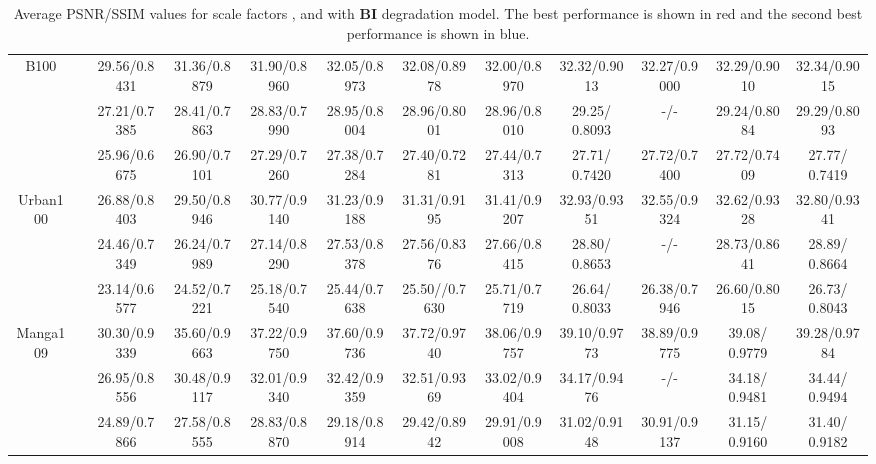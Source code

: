 \documentclass[10pt,twocolumn,letterpaper]{article}
\begin{document}
\begin{table*}[!htbp]
{\begin{tabular}{|c|c|c|c|c|c|c|c||c|c|c|c|}
			\multirow{3}{*}{B100}     &  &  29.56/0.8431            &     31.36/0.8879        &   31.90/0.8960   &     32.05/0.8973     &    32.08/0.8978  & 32.00/0.8970   &  {\color{blue}32.32}/{\color{blue}0.9013}    &   32.27/0.9000  &  32.29/0.9010    &   {\color{red}32.34}/{\color{red}0.9015}   \\
			&  &    27.21/0.7385          &    28.41/0.7863          &  28.83/0.7990    &       28.95/0.8004     &   28.96/0.8001 & 28.96/0.8010    &  {\color{blue}29.25}/{\color{red} 0.8093}    &    -/-   &  29.24/{\color{blue}0.8084}    &  {\color{red}29.29}/{\color{red}0.8093}     \\ 
			&  &    25.96/0.6675          &     26.90/0.7101         &   27.29/0.7260   &    27.38/0.7284        &     27.40/0.7281 & 27.44/0.7313  &   27.71/{\color{blue} 0.7420}   &  {\color{blue} 27.72}/0.7400    &  {\color{blue} 27.72}/0.7409    &  {\color{red} 27.77}/{\color{red} 0.7419}      \\ \hline\hline
			\multirow{3}{*}{Urban100} &  &  26.88/0.8403            &    29.50/0.8946          &  30.77/0.9140    &        31.23/0.9188    &    31.31/0.9195  & 31.41/0.9207  &  {\color{red}32.93}/{\color{red}0.9351}    &   32.55/0.9324   &  32.62/0.9328    &  {\color{blue}32.80}/{\color{blue}0.9341}     \\ 
			&  &   24.46/0.7349           &     26.24/0.7989         &  27.14/0.8290    &       27.53/0.8378       &   27.56/0.8376 & 27.66/0.8415    &   {\color{blue}28.80}/{\color{blue} 0.8653}   &   -/-   &    28.73/0.8641  &   {\color{red} 28.89}/{\color{red} 0.8664}    \\
			&  &   23.14/0.6577            &       24.52/0.7221       &    25.18/0.7540  &      25.44/0.7638       &    25.50//0.7630  & 25.71/0.7719  &   {\color{blue} 26.64}/{\color{blue} 0.8033}   &   26.38/0.7946   &  26.60/0.8015   & {\color{red} 26.73}/{\color{red} 0.8043}      \\ \hline\hline
			\multirow{3}{*}{Manga109} &  &  30.30/0.9339            &     35.60/0.9663         &   37.22/0.9750   &    37.60/0.9736      &    37.72/0.9740  & 38.06/0.9757  &   {\color{blue}39.10}/0.9773   &   38.89/0.9775   &  39.08/{\color{blue} 0.9779}    &    {\color{red}39.28}/{\color{red}0.9784}  \\ 
			&  &    26.95/0.8556          &      30.48/0.9117        &   32.01/0.9340   &      32.42/0.9359       &   32.51/0.9369  & 33.02/0.9404   &   34.17/0.9476   &  -/-    &   {\color{blue} 34.18}/{\color{blue} 0.9481}   &   {\color{red} 34.44}/{\color{red} 0.9494}    \\ 
			&  &    24.89/0.7866          &       27.58/0.8555       &   28.83/0.8870   &      29.18/0.8914    &   29.42/0.8942 & 29.91/0.9008    &   31.02/0.9148   &  30.91/0.9137    &  {\color{blue} 31.15}/{\color{blue} 0.9160}   &   {\color{red} 31.40}/{\color{red} 0.9182}    \\ \hline
	\end{tabular}}
	\smallskip
	\caption{Average PSNR/SSIM values for scale factors ,  and  with \textbf{BI} degradation model. The best performance is shown in {\color{red} red} and the second best performance is shown in {\color{blue} blue}.\label{comp_sot_bi}}
	

\end{table*}
\end{document}

